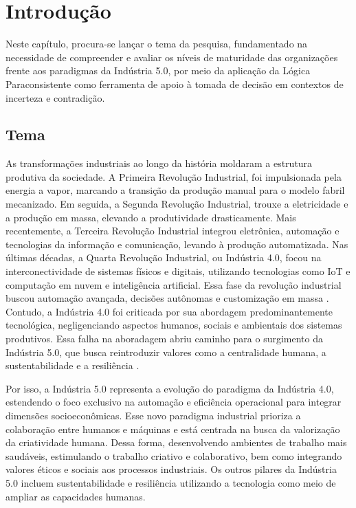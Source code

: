 

\chapter{Introdução}\label{cap:introducao}

Neste capítulo, procura-se lançar o tema da pesquisa, fundamentado na necessidade de compreender e avaliar os níveis de maturidade das organizações frente aos paradigmas da Indústria 5.0, por meio da aplicação da Lógica Paraconsistente como ferramenta de apoio à tomada de decisão em contextos de incerteza e contradição.

\section{Tema}

As transformações industriais ao longo da história moldaram a estrutura produtiva da sociedade.
A Primeira Revolução Industrial, foi impulsionada pela energia a vapor, marcando a transição da produção manual para o modelo fabril mecanizado.
Em seguida, a Segunda Revolução Industrial, trouxe a eletricidade e a produção em massa, elevando a produtividade drasticamente.
Mais recentemente, a Terceira Revolução Industrial integrou eletrônica, automação e tecnologias da informação e comunicação, levando à produção automatizada.
Nas últimas décadas, a Quarta Revolução Industrial, ou Indústria 4.0, focou na interconectividade de sistemas físicos e digitais, utilizando tecnologias como \gls{IoT} e computação em nuvem e inteligência artificial.
Essa fase da revolução industrial buscou automação avançada, decisões autônomas e customização em massa \cite{VALETTE2023}.
Contudo, a Indústria 4.0 foi criticada por sua abordagem predominantemente tecnológica, negligenciando aspectos humanos, sociais e ambientais dos sistemas produtivos.
Essa falha na aboradagem abriu caminho para o surgimento da Indústria 5.0, que busca reintroduzir valores como a centralidade humana, a sustentabilidade e a resiliência \cite{Xu2021, PIZON2023}.

Por isso, a Indústria 5.0 representa a evolução do paradigma da Indústria 4.0, estendendo o foco exclusivo na automação e eficiência operacional para integrar dimensões socioeconômicas.
Esse novo paradigma industrial prioriza a colaboração entre humanos e máquinas e está centrada na busca da valorização da criatividade humana.
Dessa forma, desenvolvendo ambientes de trabalho mais saudáveis, estimulando o trabalho criativo e colaborativo, bem como integrando valores éticos e sociais aos processos industriais.
Os outros pilares da Indústria 5.0 incluem sustentabilidade e resiliência utilizando a tecnologia como meio de ampliar as capacidades humanas.


